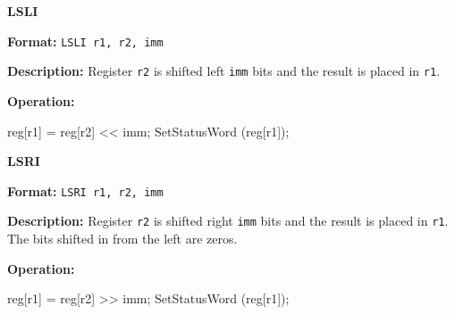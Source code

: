 \noindent\textsf{\textbf{\Large LSLI}}\par
{}\par\begin{indented}{\bf Format:}
{\tt LSLI r1, r2, imm}\par\vspace{3ex}
\end{indented}\vspace{4ex}
\begin{indented}{\bf Description:}
Register {\tt r2} is shifted left {\tt imm} bits and the result is placed
in {\tt r1}.
\end{indented}
\begin{indented}{\bf Operation:}\vspace{.8ex}
\begin{verbatimtab}
reg[r1] = reg[r2] << imm;
SetStatusWord (reg[r1]);
\end{verbatimtab}
\end{indented}
\vspace{2em}

\newpage
\noindent\textsf{\textbf{\Large LSRI}}\par
{}\par\begin{indented}{\bf Format:}
{\tt LSRI r1, r2, imm}\par\vspace{3ex}
\end{indented}\vspace{4ex}
\begin{indented}{\bf Description:}
Register {\tt r2} is shifted right {\tt imm} bits and the result is placed
in {\tt r1}.  The bits shifted in from the left are zeros.
\end{indented}
\begin{indented}{\bf Operation:}\vspace{.8ex}
\begin{verbatimtab}
reg[r1] = reg[r2] >> imm;
SetStatusWord (reg[r1]);
\end{verbatimtab}
\end{indented}
\vspace{2em}

